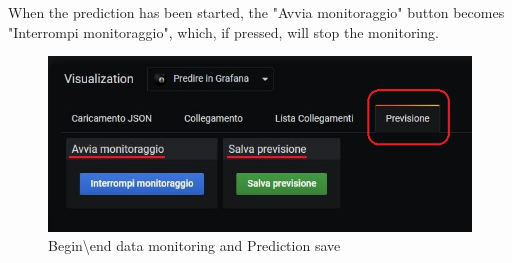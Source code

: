 When the prediction has been started, the "Avvia monitoraggio" button becomes "Interrompi monitoraggio", which, if pressed, will stop the monitoring.

\begin{figure}[H]
\centering
\includegraphics[scale=0.95]{img/plug-in/save_previsione.jpg}
\caption{Begin\textbackslash end data monitoring and Prediction save}

\end{figure} 
 

